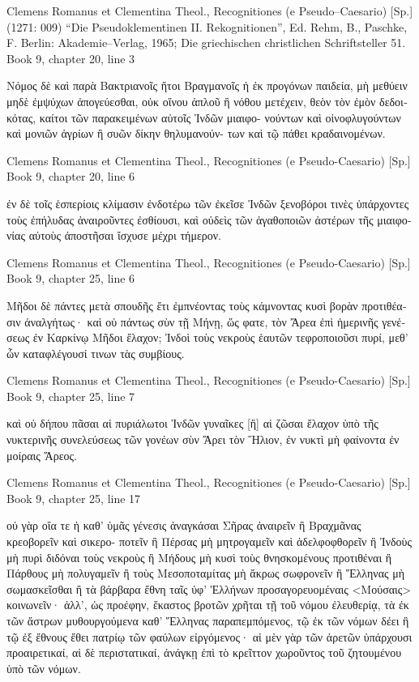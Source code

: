 \documentclass[12pt,letterpaper,twoside,final]{memoir}
\begin{document}
\begin{greek}



Clemens Romanus et Clementina Theol., Recognitiones (e Pseudo–Caesario) [Sp.] (1271: 009)
“Die Pseudoklementinen II. Rekognitionen”, Ed. Rehm, B., Paschke, F.
Berlin: Akademie–Verlag, 1965; Die griechischen christlichen Schriftsteller 51.
Book 9, chapter 20, line 3

Νόμος δὲ καὶ παρὰ Βακτριανοῖς ἤτοι Βραγμανοῖς ἡ ἐκ προγόνων παιδεία, 
μὴ μεθύειν μηδὲ ἐμψύχων ἀπογεύεσθαι, οὐκ οἴνου ἁπλοῦ ἢ νόθου μετέχειν,   
θεὸν τὸν ἐμὸν δεδοικότας, καίτοι τῶν παρακειμένων αὐτοῖς Ἰνδῶν μιαιφο-
νούντων καὶ οἰνοφλυγούντων καὶ μονιῶν ἀγρίων ἢ συῶν δίκην θηλυμανούν-
των καὶ τῷ πάθει κραδαινομένων. 



Clemens Romanus et Clementina Theol., Recognitiones (e Pseudo-Caesario) [Sp.] 
Book 9, chapter 20, line 6

                                     ἐν δὲ τοῖς ἑσπερίοις κλίμασιν ἐνδοτέρω τῶν 
ἐκεῖσε Ἰνδῶν ξενοβόροι τινὲς ὑπάρχοντες τοὺς ἐπήλυδας ἀναιροῦντες 
ἐσθίουσι, καὶ οὐδεὶς τῶν ἀγαθοποιῶν ἀστέρων τῆς μιαιφονίας αὐτοὺς 
ἀποστῆσαι ἴσχυσε μέχρι τήμερον. 


Clemens Romanus et Clementina Theol., Recognitiones (e Pseudo-Caesario) [Sp.] 
Book 9, chapter 25, line 6

Μῆδοι δὲ πάντες μετὰ σπουδῆς ἔτι ἐμπνέοντας τοὺς κάμνοντας κυσὶ βορὰν   
προτιθέασιν ἀναλγήτως· καὶ οὐ πάντως σὺν τῇ Μήνῃ, ὥς φατε, τὸν Ἄρεα 
ἐπὶ ἡμερινῆς γενέσεως ἐν Καρκίνῳ Μῆδοι ἔλαχον; 
 Ἰνδοὶ τοὺς νεκροὺς ἑαυτῶν τεφροποιοῦσι πυρί, μεθ' ὧν καταφλέγουσί 
τινων τὰς συμβίους. 






Clemens Romanus et Clementina Theol., Recognitiones (e Pseudo-Caesario) [Sp.] 
Book 9, chapter 25, line 7

                      καὶ οὐ δήπου πᾶσαι αἱ πυριάλωτοι Ἰνδῶν γυναῖκες [ἢ] 
αἱ ζῶσαι ἔλαχον ὑπὸ τῆς νυκτερινῆς συνελεύσεως τῶν γονέων σὺν Ἄρει 
τὸν Ἥλιον, ἐν νυκτὶ μὴ φαίνοντα ἐν μοίραις Ἄρεος. 



Clemens Romanus et Clementina Theol., Recognitiones (e Pseudo-Caesario) [Sp.] 
Book 9, chapter 25, line 17

                                                              οὐ γὰρ οἵα τε ἡ καθ' 
ὑμᾶς γένεσις ἀναγκάσαι Σῆρας ἀναιρεῖν ἢ Βραχμᾶνας κρεοβορεῖν καὶ σικερο-
ποτεῖν ἢ Πέρσας μὴ μητρογαμεῖν καὶ ἀδελφοφθορεῖν ἢ Ἰνδοὺς μὴ πυρὶ 
διδόναι τοὺς νεκροὺς ἢ Μήδους   
μὴ κυσὶ τοὺς θνησκομένους προτιθέναι ἢ Πάρθους μὴ πολυγαμεῖν ἢ τοὺς 
Μεσοποταμίτας μὴ ἄκρως σωφρονεῖν ἢ Ἕλληνας μὴ σωμασκεῖσθαι ἢ τὰ 
βάρβαρα ἔθνη ταῖς ὑφ' Ἑλλήνων προσαγορευομέναις <Μούσαις> κοινωνεῖν· 
ἀλλ', ὡς προέφην, ἕκαστος βροτῶν χρῆται τῇ τοῦ νόμου ἐλευθερίᾳ, τὰ 
ἐκ τῶν ἄστρων μυθουργούμενα καθ' Ἕλληνας παραπεμπόμενος, τῷ ἐκ τῶν 
νόμων δέει ἢ τῷ ἐξ ἔθνους ἔθει πατρίῳ τῶν φαύλων εἰργόμενος· αἱ μὲν γὰρ 
τῶν ἀρετῶν ὑπάρχουσι προαιρετικαί, αἱ δὲ περιστατικαί, ἀνάγκῃ ἐπὶ τὸ 
κρεῖττον χωροῦντος τοῦ ζητουμένου ὑπὸ τῶν νόμων. 




\end{greek}
\end{document}
